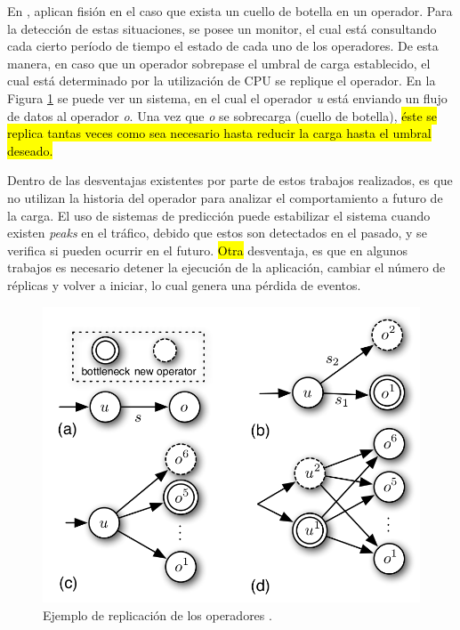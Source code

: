 En \citep{FernandezMKP13}, aplican fisión en el caso que exista un cuello de botella en un operador. Para la detección de estas situaciones, se posee un monitor, el cual está consultando cada cierto período de tiempo el estado de cada uno de los operadores. De esta manera, en caso que un operador sobrepase el umbral de carga establecido, el cual está determinado por la utilización de CPU se replique el operador. En la Figura \ref{fig:ejFision} se puede ver un sistema, en el cual el operador \textit{u} está enviando un flujo de datos al operador \textit{o}. Una vez que \textit{o} se sobrecarga (cuello de botella),\hl{ éste se replica tantas veces como sea necesario hasta reducir la carga hasta el umbral deseado.}

Dentro de las desventajas existentes por parte de estos trabajos realizados, es que no utilizan la historia del operador para analizar el comportamiento a futuro de la carga. El uso de sistemas de predicción puede estabilizar el sistema cuando existen \textit{peaks} en el tráfico, debido que estos son detectados en el pasado, y se verifica si pueden ocurrir en el futuro. \hl{Otra} desventaja, es que en algunos trabajos es necesario detener la ejecución de la aplicación, cambiar el número de réplicas y volver a iniciar, lo cual genera una pérdida de eventos.

\newpage
\begin{figure}[!ht]
	\centering
	\includegraphics[scale=0.3]{images/EjFision.png}
	\caption{Ejemplo de replicación de los operadores \citep{FernandezMKP13}.}
	\label{fig:ejFision}
\end{figure}